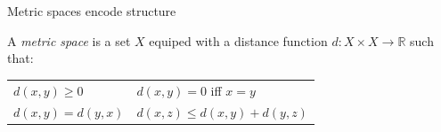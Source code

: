 \begin{frame}[fragile]{Metric spaces encode structure}
{\begin{tikzpicture}[dot/.style={circle,inner sep=2pt,fill,name=#1},
    extended line/.style={shorten >=-#1,shorten <=-#1},
    extended line/.default=1cm]


\end{tikzpicture}
}
\begin{defn}
A \emph{metric space} is a set ${X}$ equiped with a distance function $d : {X} \times {X} \rightarrow \mathbb{R}$ such that:
\begin{center}
\begin{tabular}{ll}
$d(x,y) \ge 0$ & $d(x,y) = 0$ iff $x=y$ \\
$d(x,y) = d(y,x)$ & $d(x,z) \le d(x,y) + d(y,z)$ \\
\end{tabular}
\end{center}
\end{defn}


\end{frame}
